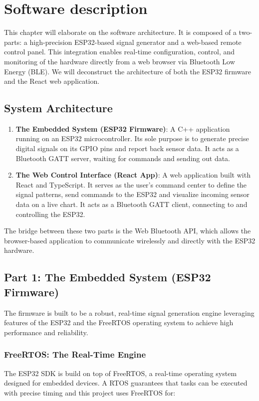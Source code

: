 \section{Software description}

This chapter will elaborate on the software architecture. It is composed of a two-parts: a high-precision ESP32-based signal generator 
and a web-based remote control panel. This integration enables real-time configuration, control, and monitoring of the hardware 
directly from a web browser via Bluetooth Low Energy (BLE). We will deconstruct the architecture of both the ESP32 firmware 
and the React web application.

\subsection{System Architecture}

\begin{enumerate}
    \item \textbf{The Embedded System (ESP32 Firmware)}: A C++ application running on an ESP32 microcontroller. Its sole 
        purpose is to generate precise digital signals on its GPIO pins and report back sensor data. It acts as a Bluetooth 
        GATT server, waiting for commands and sending out data.
    \item \textbf{The Web Control Interface (React App)}: A web application built with React and TypeScript. It serves as 
        the user's command center to define the signal patterns, send commands to the ESP32 and visualize incoming sensor
        data on a live chart. It acts as a Bluetooth GATT client, connecting to and controlling the ESP32.
\end{enumerate}

The bridge between these two parts is the Web Bluetooth API, which allows the browser-based application to communicate 
wirelessly and directly with the ESP32 hardware.

\subsection{Part 1: The Embedded System (ESP32 Firmware)}
The firmware is built to be a robust, real-time signal generation engine leveraging features of the ESP32 
and the FreeRTOS operating system to achieve high performance and reliability.

\subsubsection{FreeRTOS: The Real-Time Engine}
The ESP32 SDK is build on top of FreeRTOS, a real-time operating system designed for embedded devices. 
A RTOS guarantees that tasks can be executed with precise timing and this project uses FreeRTOS for:

